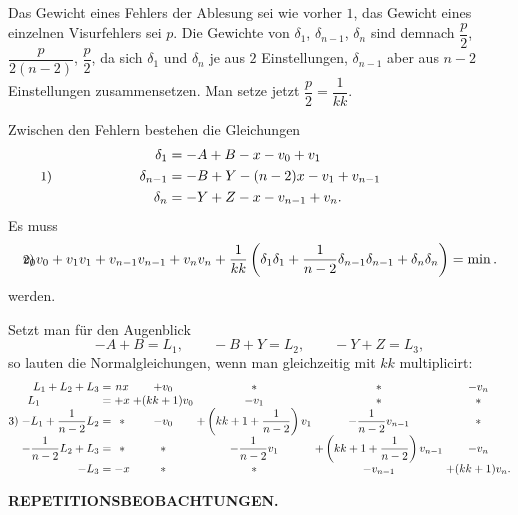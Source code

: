 Das Gewicht eines Fehlers der Ablesung sei wie vorher $1$, das Gewicht eines einzelnen Visurfehlers sei $p$. Die Gewichte von $\delta_1$, $\delta_{n-1}$, $\delta_n$ sind demnach $\dfrac{p}{2}$, $\dfrac{p}{2(n-2)}$, $\dfrac{p}{2}$, da sich $\delta_1$ und $\delta_n$ je aus $2$ Einstellungen, $\delta_{n-1}$ aber aus $n-2$ Einstellungen zusammensetzen. Man setze jetzt $\dfrac{p}{2}=\dfrac{1}{kk}$.

Zwischen den Fehlern bestehen die Gleichungen
\[
\makebox[\linewidth]{\hspace*{\parindent}\makebox[0pt][l]{\small 1)}\hfill
\(\displaystyle
 \begin{aligned}
  \delta_1 &= -A+B-x-v_0+v_1\\
  \delta_{n-1} &= -B+Y-(n-2)x-v_1+v_{n-1}\\
  \delta_n &= -Y+Z-x-v_{n-1}+v_n.
 \end{aligned}
\)\hfill\hspace*{\parindent}}
\]
\indent Es muss
\[
\makebox[\linewidth]{\hspace*{\parindent}\makebox[0pt][l]{\small 2)}\hfill
\(\displaystyle
 v_0v_0+v_1v_1+v_{n-1}v_{n-1}+v_nv_n+
 \frac{1}{kk}\left(\delta_1\delta_1+
 \frac{1}{n-2}\delta_{n-1}\delta_{n-1}+\delta_n\delta_n\right)=\min.
\)\hfill\hspace*{\parindent}}
\]
werden.

Setzt man für den Augenblick
\[
 -A+B=L_1,\qquad -B+Y=L_2,\qquad -Y+Z=L_3,
\]
so lauten die Normalgleichungen, wenn man gleichzeitig mit $kk$ multiplicirt:
{\small
\[
\begin{array}{@{}l@{\;}r@{\;}c@{\;}c@{\;}c@{\;}c@{\;}c@{\;}c@{}}
 & L_1+L_2+L_3 &=& nx & +v_0 & * & * & -v_n\\
 & \multicolumn{1}{l@{\;}}{L_1} &=& +x & +(kk+1)v_0 & -v_1 & * & *\\
 \text{3)} & -L_1+\dfrac{1}{n-2}L_2 &=& * & -v_0 &
  +\left(kk+1+\dfrac{1}{n-2}\right)v_1 & -\dfrac{1}{n-2}v_{n-1} & *\\[3pt]
 & -\dfrac{1}{n-2}L_2+L_3 &=& * & * &
  -\dfrac{1}{n-2}v_1 & +\left(kk+1+\dfrac{1}{n-2}\right)v_{n-1} & -v_n\\[3pt]
 & -L_3 &=& -x & * & * & -v_{n-1} & +(kk+1)v_n.
\end{array}
\]
}

\par\clearpage
\noindent\null\hfill{\small\textbf{REPETITIONSBEOBACHTUNGEN.}}\hfill{}\par\medskip

